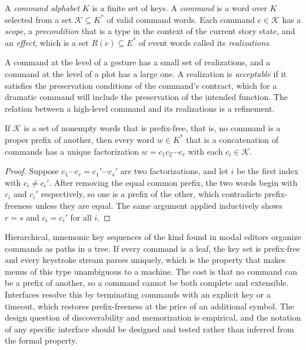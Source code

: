 \begin{definition}
A \emph{command alphabet} $K$ is a finite set of keys. A \emph{command} is a word over $K$ selected from a set $\mathcal{K}\subseteq K^*$ of valid command words. Each command $c\in\mathcal{K}$ has a \emph{scope}, a \emph{precondition} that is a type in the context of the current story state, and an \emph{effect}, which is a set $R(c)\subseteq E^*$ of event words called its \emph{realizations}.
\end{definition}

A command at the level of a gesture has a small set of realizations, and a command at the level of a plot has a large one. A realization is \emph{acceptable} if it satisfies the preservation conditions of the command's contract, which for a dramatic command will include the preservation of the intended function. The relation between a high-level command and its realizations is a refinement.

\begin{proposition}\label{prop:prefixfree}
If $\mathcal{K}$ is a set of nonempty words that is prefix-free, that is, no command is a proper prefix of another, then every word $w\in K^*$ that is a concatenation of commands has a unique factorization $w=c_1c_2\cdots c_r$ with each $c_i\in\mathcal{K}$.
\end{proposition}

\begin{proof}
Suppose $c_1\cdots c_r=c_1'\cdots c_s'$ are two factorizations, and let $i$ be the first index with $c_i\ne c_i'$. After removing the equal common prefix, the two words begin with $c_i$ and $c_i'$ respectively, so one is a prefix of the other, which contradicts prefix-freeness unless they are equal. The same argument applied inductively shows $r=s$ and $c_i=c_i'$ for all $i$.
\end{proof}

Hierarchical, mnemonic key sequences of the kind found in modal editors organize commands as paths in a tree. If every command is a leaf, the key set is prefix-free and every keystroke stream parses uniquely, which is the property that makes menus of this type unambiguous to a machine. The cost is that no command can be a prefix of another, so a command cannot be both complete and extensible. Interfaces resolve this by terminating commands with an explicit key or a timeout, which restores prefix-freeness at the price of an additional symbol. The design question of discoverability and memorization is empirical, and the notation of any specific interface should be designed and tested rather than inferred from the formal property.


